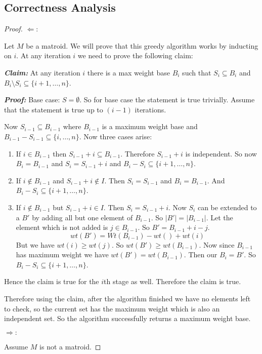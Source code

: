 \documentclass{article}
\begin{document}
\subsection{Correctness Analysis}
\begin{proof}
	$\Leftarrow:$\parinf
	
	Let $M$ be a matroid. We will prove that this greedy algorithm works by inducting on $i$. At any iteration $i$ we need to prove the following claim:
	
	\textbf{\textit{Claim:}} At any iteration $i$ there is a max weight base $B_i$ such that $S_i\subseteq B_i$ and $B_i\setminus S_i\subseteq \{i+1,\dots, n\}$.
	
	\textbf{\textit{Proof:}} Base case: $S=\emptyset$. So for base case the statement is true trivially. Assume that the statement is true up to $(i-1)$ iterations.\parinn
	
	Now $S_{i-1}\subseteq B_{i-1}$ where $B_{i-1}$ is a maximum weight base and $B_{i-1}-S_{i-1}\subseteq \{i,\dots, n\}$. Now three cases arise:
	\begin{enumerate}[label=\bfseries Case \arabic*:,leftmargin=1.5cm]
		\item If $i\in B_{i-1}$ then $S_{i-1}+i\subseteq B_{i-1}$. Therefore $S_{i-1}+i$ is independent. So now $B_i=B_{i-1}$ and $S_i=S_{i-1}+i$ and $B_i-S_i\subseteq \{i+1,\dots, n\}$.
		\item If $i\notin B_{i-1}$ and $S_{i-1}+i\notin I$. Then $S_i=S_{i-1}$ and $B_i=B_{i-1}$. And $B_i-S_i\subseteq \{i+1,\dots , n\}$.
		\item If $i\notin B_{i-1}$ but $S_{i-1}+i\in I$. Then $S_i=S_{i-1}+i$. Now $S_i$ can be extended to a $B'$ by adding all but one element of $B_{i-1}$. So $|B'|=|B_{i-1}|$. Let the element which is not added is $j\in B_{i-1}$. So $B'=B_{i-1}+i-j$. $$wt(B')=Wt(B_{i-1})-wt()+wt(i)$$But we have $wt(i)\geq wt(j)$. So $wt(B')\geq wt(B_{i-1})$. Now since $B_{i-1}$ has maximum weight we have $wt(B')=wt(B_{i-1})$. Then our $B_i=B'$. So $B_i-S_i\subseteq \{i+1,\dots, n\}$.
	\end{enumerate}
	Hence the claim is true for the $i$th stage as well. Therefore the claim is true.\Qed
	
	Therefore using the claim, after the algorithm finished we have no elements left to check, so the current set has the maximum weight which is also an independent set. So the algorithm successfully returns a maximum weight base.\parinf
	
	$\Rightarrow:$
	
	Assume $M$ is not a matroid.
	
\end{proof}
\end{document}
